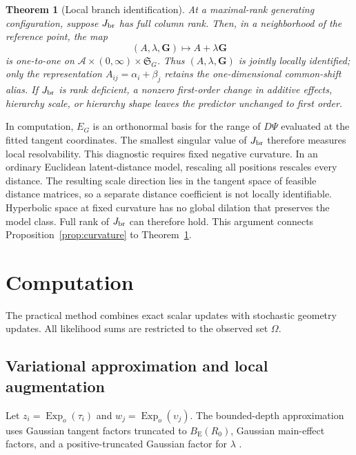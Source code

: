 \documentclass[
  12pt]{article}
\newtheorem{theorem}{Theorem}[section]
\theoremstyle{definition}
\theoremstyle{plain}
\newcommand{\calA}{\mathcal A}
\newcommand{\bG}{\mathbf G}
\DeclareMathOperator{\Exp}{Exp}
\begin{document}
\begin{theorem}[Local branch identification]
\label{thm:localid}
At a maximal-rank generating configuration, suppose $J_{\rm br}$ has full column rank. Then, in a neighborhood of the reference point, the map
\[
(A,\lambda,\bG)\mapsto A+\lambda\bG
\]
is one-to-one on $\calA\times(0,\infty)\times\mathfrak S_G$. Thus $(A,\lambda,\bG)$ is jointly locally identified; only the representation $A_{ij}=\alpha_i+\beta_j$ retains the one-dimensional common-shift alias. If $J_{\rm br}$ is rank deficient, a nonzero first-order change in additive effects, hierarchy scale, or hierarchy shape leaves the predictor unchanged to first order.
\end{theorem}


In computation, $E_G$ is an orthonormal basis for the range of $D\Psi$ evaluated at the fitted tangent coordinates. The smallest singular value of $J_{\rm br}$ therefore measures local resolvability. This diagnostic requires fixed negative curvature. In an ordinary Euclidean latent-distance model, rescaling all positions rescales every distance. The resulting scale direction lies in the tangent space of feasible distance matrices, so a separate distance coefficient is not locally identifiable. Hyperbolic space at fixed curvature has no global dilation that preserves the model class. Full rank of $J_{\rm br}$ can therefore hold. This argument connects Proposition~\ref{prop:curvature} to Theorem~\ref{thm:localid}.
\section{Computation}
\label{sec:computation}

The practical method combines exact scalar updates with stochastic geometry updates. All likelihood sums are restricted to the observed set $\Omega$.

\subsection{Variational approximation and local augmentation}

Let $z_i=\Exp_o(\tau_i)$ and $w_j=\Exp_o(\upsilon_j)$. The bounded-depth approximation uses Gaussian tangent factors truncated to $B_{\mathrm E}(R_0)$, Gaussian main-effect factors, and a positive-truncated Gaussian factor for $\lambda$ \citep{wainwright_2008_GraphicalModelsExponential,blei_2017_VariationalInferenceReview}.
\end{document}
